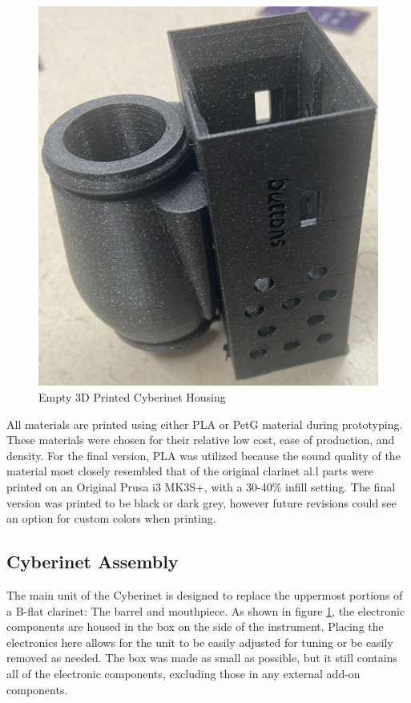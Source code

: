 \begin{center}
    \begin{figure}
        \centering
        \includegraphics[scale=0.1]{diagrams/builtUnits/emptyCase.JPG}
        \caption{Empty 3D Printed Cyberinet Housing}
        \label{fig:cybernetCase}
    \end{figure}
\end{center}

All materials are printed using either PLA or PetG material during prototyping. These materials were chosen for their relative low cost, ease of production, and density. For the final version, PLA was utilized because the sound quality of the material most closely resembled that of the original clarinet al.l parts were printed on an Original Prusa i3 MK3S+, with a 30-40\% infill setting. The final version was printed to be black or dark grey, however future revisions could see an option for custom colors when printing.


\subsection{Cyberinet Assembly}

The main unit of the Cyberinet is designed to replace the uppermost portions of a B-flat clarinet: The barrel and mouthpiece. As shown in figure \ref{fig:cybernetCase}, the electronic components are housed in the box on the side of the instrument. Placing the electronics here allows for the unit to be easily adjusted for tuning or be easily removed as needed. The box was made as small as possible, but it still contains all of the electronic components, excluding those in any external add-on components. 

